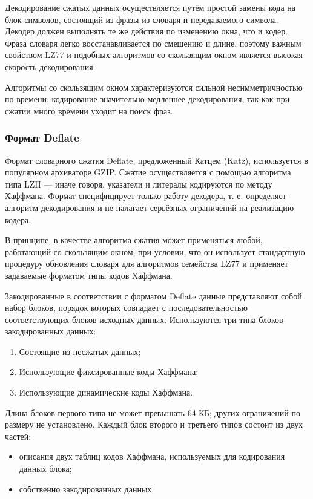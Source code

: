 \documentclass[12pt]{article}
\begin{document}
Декодирование сжатых данных осуществляется путём простой
замены кода на блок символов, состоящий из фразы из словаря и передаваемого символа.
Декодер должен выполнять те же действия по изменению окна, что и кодер.
Фраза словаря легко восстанавливается по смещению и длине,
поэтому важным свойством LZ77 и подобных алгоритмов со скользящим окном является
высокая скорость декодирования.

Алгоритмы со скользящим окном характеризуются сильной несимметричностью по времени:
кодирование значительно медленнее декодирования,
так как при сжатии много времени уходит на поиск фраз.

\subsubsection{Формат Deflate}

Формат словарного сжатия Deflate, предложенный Катцем (Katz),
используется в популярном архиваторе GZIP.
Сжатие осуществляется с помощью алгоритма типа LZH —
иначе говоря, указатели и литералы кодируются по методу Хаффмана.
Формат специфицирует только работу декодера, т. е. определяет алгоритм декодирования
и не налагает серьёзных ограничений на реализацию кодера.

В принципе, в качестве алгоритма сжатия может применяться любой, работающий со скользящим окном,
при условии, что он использует стандартную процедуру обновления словаря для алгоритмов семейства LZ77
и применяет задаваемые форматом типы кодов Хаффмана.

Закодированные в соответствии с форматом Deflate данные представляют собой набор блоков,
порядок которых совпадает с последовательностью соответствующих блоков исходных данных.
Используются три типа блоков закодированных данных:

\begin{enumerate}
    \item Состоящие из несжатых данных;
    \item Использующие фиксированные коды Хаффмана;
    \item Использующие динамические коды Хаффмана.
\end{enumerate}

Длина блоков первого типа не может превышать 64 КБ; других ограничений по размеру не установлено.
Каждый блок второго и третьего типов состоит из двух частей:

\begin{itemize}[label=-]
    \item описания двух таблиц кодов Хаффмана, используемых для кодирования данных блока;
    \item собственно закодированных данных.
\end{itemize}
\end{document}
